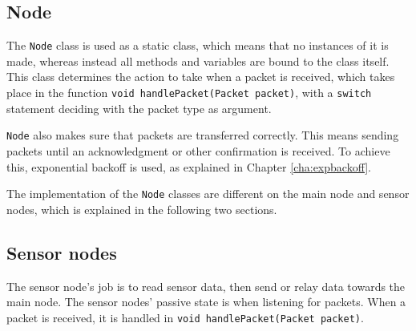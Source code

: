 \subsection{Node}
The \texttt{Node} class is used as a static class, which means that no instances of it is made, whereas instead all methods and variables are bound to the class itself. This class determines the action to take when a packet is received, which takes place in the function \texttt{void handlePacket(Packet packet)}, with a \texttt{switch} statement deciding with the packet type as argument.

\texttt{Node} also makes sure that packets are transferred correctly. This means sending packets until an acknowledgment or other confirmation is received. To achieve this, exponential backoff is used, as explained in Chapter \ref{cha:expbackoff}.

The implementation of the \texttt{Node} classes are different on the main node and sensor nodes, which is explained in the following two sections.

\subsection{Sensor nodes} 
The sensor node's job is to read sensor data, then send or relay data towards the main node. The sensor nodes' passive state is when listening for packets. When a packet is received, it is handled in \texttt{void handlePacket(Packet packet)}.  

